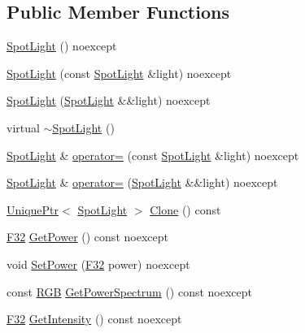 \subsection*{Public Member Functions}
\begin{DoxyCompactItemize}
\item 
\hyperlink{classmage_1_1_spot_light_ae82577a45cf84c375a58b1789a05ce0d}{Spot\+Light} () noexcept
\item 
\hyperlink{classmage_1_1_spot_light_a93287b22630e43766fdab04e0c235a30}{Spot\+Light} (const \hyperlink{classmage_1_1_spot_light}{Spot\+Light} \&light) noexcept
\item 
\hyperlink{classmage_1_1_spot_light_a694e2e49340440515438a86baa284431}{Spot\+Light} (\hyperlink{classmage_1_1_spot_light}{Spot\+Light} \&\&light) noexcept
\item 
virtual \hyperlink{classmage_1_1_spot_light_aeeaba91c6448102ac6a23587c5366808}{$\sim$\+Spot\+Light} ()
\item 
\hyperlink{classmage_1_1_spot_light}{Spot\+Light} \& \hyperlink{classmage_1_1_spot_light_a5923f3d1ec5061965af8094e1e1d3855}{operator=} (const \hyperlink{classmage_1_1_spot_light}{Spot\+Light} \&light) noexcept
\item 
\hyperlink{classmage_1_1_spot_light}{Spot\+Light} \& \hyperlink{classmage_1_1_spot_light_a4a618538ddc977e4c81be098b35ed2ac}{operator=} (\hyperlink{classmage_1_1_spot_light}{Spot\+Light} \&\&light) noexcept
\item 
\hyperlink{namespacemage_a3316d7143a973e37adf1110f2e80ca31}{Unique\+Ptr}$<$ \hyperlink{classmage_1_1_spot_light}{Spot\+Light} $>$ \hyperlink{classmage_1_1_spot_light_a1092a1238be8cfd771a43e6976d16270}{Clone} () const
\item 
\hyperlink{namespacemage_aa97e833b45f06d60a0a9c4fc22ae02c0}{F32} \hyperlink{classmage_1_1_spot_light_afcfb600550f5ca9292e79e5bedb9fad7}{Get\+Power} () const noexcept
\item 
void \hyperlink{classmage_1_1_spot_light_aa2f5ad93e148d2d4fcf1512869c1ffa2}{Set\+Power} (\hyperlink{namespacemage_aa97e833b45f06d60a0a9c4fc22ae02c0}{F32} power) noexcept
\item 
const \hyperlink{structmage_1_1_r_g_b}{R\+GB} \hyperlink{classmage_1_1_spot_light_a2c9926f4332198ef4183f7958e9a5644}{Get\+Power\+Spectrum} () const noexcept
\item 
\hyperlink{namespacemage_aa97e833b45f06d60a0a9c4fc22ae02c0}{F32} \hyperlink{classmage_1_1_spot_light_a3df0792c637a6167c7c596ce125abbe0}{Get\+Intensity} () const noexcept
\item 

\end{DoxyCompactItemize}
